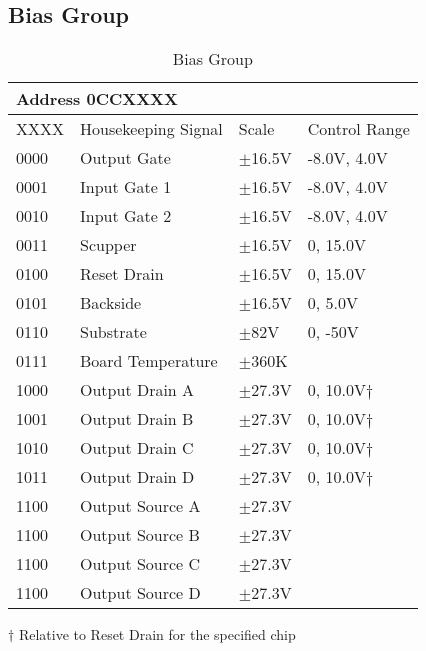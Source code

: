 \documentclass[12pt]{article}
\let\oldsubsection\subsection
\renewcommand{\subsection}{\FloatBarrier\oldsubsection}
\begin{document}
\subsection{Bias Group}
\begin{table}[ht!]
\caption{Bias Group}
\begin{tabular}{|l|l|l|l|}
\hline
\multicolumn{4}{|l|}{Address 0CCXXXX} \\
\hline
XXXX & Housekeeping Signal & Scale & Control Range \\
\hline
0000 & Output Gate & $\pm$16.5V & -8.0V, 4.0V \\
0001 & Input Gate 1 & $\pm$16.5V   & -8.0V, 4.0V \\
0010 & Input Gate 2 & $\pm$16.5V   & -8.0V, 4.0V \\
0011 & Scupper & $\pm$16.5V  & 0, 15.0V \\
0100 & Reset Drain & $\pm$16.5V & 0, 15.0V \\
0101 & Backside & $\pm$16.5V & 0, 5.0V \\
0110 & Substrate & $\pm$82V  & 0, -50V \\
0111 & Board Temperature & $\pm$360K &\\
1000 & Output Drain A & $\pm$27.3V & 0, 10.0V$\dagger$ \\
1001 & Output Drain B & $\pm$27.3V& 0, 10.0V$\dagger$ \\
1010 & Output Drain C & $\pm$27.3V& 0, 10.0V$\dagger$ \\
1011 & Output Drain D & $\pm$27.3V&  0, 10.0V$\dagger$ \\
1100 & Output Source A & $\pm$27.3V &\\
1100 & Output Source B & $\pm$27.3V &\\
1100 & Output Source C & $\pm$27.3V &\\
1100 & Output Source D & $\pm$27.3V &\\
\hline
\end{tabular}
\vspace{5pt}

$\dagger$ Relative to Reset Drain for the specified chip
\label{biastab}
\end{table}
\end{document}
